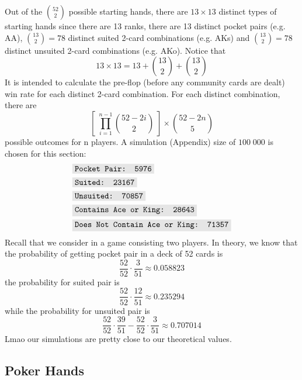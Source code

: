 \documentclass{article}
\newcommand{\code}[1]{\colorbox{codegray}{\texttt{#1}}}
\begin{document}
Out of the $\displaystyle \binom{52}{2}$ possible starting hands, there 
are $13 \times 13$ distinct types of starting hands since there are 13 
ranks, there are 13 distinct pocket pairs (e.g. AA), $\displaystyle 
\binom{13}{2} = 78$ distinct suited 2-card combinations (e.g. AKs) 
and $\displaystyle \binom{13}{2} = 78$ distinct unsuited 2-card 
combinations (e.g. AKo). Notice that 
\[
    13 \times 13 = 13 + \binom{13}{2} + \binom{13}{2}
\]
It is intended to calculate the pre-flop 
(before any community cards are dealt) win rate for each distinct 
2-card combination. For each distinct combination, there are 
\[
    \left[ \; \prod_{i = 1}^{n - 1} \binom{52 - 2i}{2} \; \right] \times \binom{52 - 2n}{5}
\] 
possible outcomes for n players. A simulation (Appendix) 
size of $100 \; 000$ is chosen for this section:
\begin{align*}
    & \code{Pocket Pair: 5976} \\
    & \code{Suited: 23167} \\
    & \code{Unsuited: 70857} \\
    & \code{Contains Ace or King: 28643} \\
    & \code{Does Not Contain Ace or King: 71357}
\end{align*}
Recall that we consider in a game consisting two players. In theory, we 
know that the probability of getting pocket pair in a deck of 52 cards is
\[
    \frac{52}{52} \cdot \frac{3}{51} \approx \boxed{0.058823}
\]
the probability for suited pair is 
\[
    \frac{52}{52} \cdot \frac{12}{51} \approx \boxed{0.235294}
\]
while the probability for unsuited pair is 
\[
    \frac{52}{52} \cdot \frac{39}{51} - \frac{52}{52} \cdot \frac{3}{51} 
    \approx \boxed{0.707014}
\]
Lmao our simulations are pretty close to our theoretical values. 


\subsection*{Poker Hands}
\end{document}
